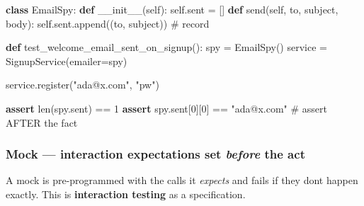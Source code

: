 \documentclass[11pt]{article}
\newenvironment{Shaded}{\begin{snugshade}}{\end{snugshade}}
\newcommand{\BuiltInTok}[1]{\textcolor[rgb]{0.50,0.55,0.55}{#1}}
\newcommand{\CommentTok}[1]{\textcolor[rgb]{0.48,0.49,0.49}{#1}}
\newcommand{\ControlFlowTok}[1]{\textcolor[rgb]{0.99,0.74,0.29}{\textbf{#1}}}
\newcommand{\DecValTok}[1]{\textcolor[rgb]{0.96,0.45,0.00}{#1}}
\newcommand{\FunctionTok}[1]{\textcolor[rgb]{0.56,0.27,0.68}{#1}}
\newcommand{\KeywordTok}[1]{\textcolor[rgb]{0.81,0.81,0.76}{\textbf{#1}}}
\newcommand{\NormalTok}[1]{\textcolor[rgb]{0.81,0.81,0.76}{#1}}
\newcommand{\OperatorTok}[1]{\textcolor[rgb]{0.81,0.81,0.76}{#1}}
\newcommand{\StringTok}[1]{\textcolor[rgb]{0.96,0.31,0.31}{#1}}
\newcommand{\VariableTok}[1]{\textcolor[rgb]{0.15,0.68,0.68}{#1}}
\begin{document}
\begin{Shaded}
\begin{Highlighting}[]
\KeywordTok{class}\NormalTok{ EmailSpy:}
    \KeywordTok{def} \FunctionTok{\_\_init\_\_}\NormalTok{(}\VariableTok{self}\NormalTok{):}
        \VariableTok{self}\NormalTok{.sent }\OperatorTok{=}\NormalTok{ []}
    \KeywordTok{def}\NormalTok{ send(}\VariableTok{self}\NormalTok{, to, subject, body):}
        \VariableTok{self}\NormalTok{.sent.append((to, subject))   }\CommentTok{\# record}

\KeywordTok{def}\NormalTok{ test\_welcome\_email\_sent\_on\_signup():}
\NormalTok{    spy }\OperatorTok{=}\NormalTok{ EmailSpy()}
\NormalTok{    service }\OperatorTok{=}\NormalTok{ SignupService(emailer}\OperatorTok{=}\NormalTok{spy)}

\NormalTok{    service.register(}\StringTok{"ada@x.com"}\NormalTok{, }\StringTok{"pw"}\NormalTok{)}

    \ControlFlowTok{assert} \BuiltInTok{len}\NormalTok{(spy.sent) }\OperatorTok{==} \DecValTok{1}
    \ControlFlowTok{assert}\NormalTok{ spy.sent[}\DecValTok{0}\NormalTok{][}\DecValTok{0}\NormalTok{] }\OperatorTok{==} \StringTok{"ada@x.com"}   \CommentTok{\# assert AFTER the fact}
\end{Highlighting}
\end{Shaded}

\subsubsection{\texorpdfstring{Mock --- interaction expectations set \emph{before} the act}{Mock --- interaction expectations set before the act}}\label{mock--interaction-expectations-set-before-the-act}

A mock is pre-programmed with the calls it \emph{expects} and fails if they don\textquotesingle t happen exactly. This is \textbf{interaction testing} as a specification.

\end{document}
